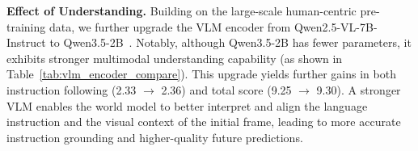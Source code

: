 \textbf{Effect of Understanding.} Building on the large-scale human-centric pre-training data, we further upgrade the VLM encoder from Qwen2.5-VL-7B-Instruct to Qwen3.5-2B~\cite{qwen3.5}. Notably, although Qwen3.5-2B has fewer parameters, it exhibits stronger multimodal understanding capability (as shown in Table~\ref{tab:vlm_encoder_compare}). This upgrade yields further gains in both instruction following (2.33 $\rightarrow$ 2.36) and total score (9.25 $\rightarrow$ 9.30). A stronger VLM enables the world model to better interpret and align the language instruction and the visual context of the initial frame, leading to more accurate instruction grounding and higher-quality future predictions.

\begin{table}[t]
\centering
\begin{minipage}[t]{0.48\textwidth}
\centering
{}
\label{tab:wm_gen_ablation}
\end{minipage}
\hfill
\begin{minipage}[t]{0.48\textwidth}
\centering
{}
\label{tab:vlm_encoder_compare}
\resizebox{\textwidth}{!}{%
}
\end{minipage}
\end{table}
